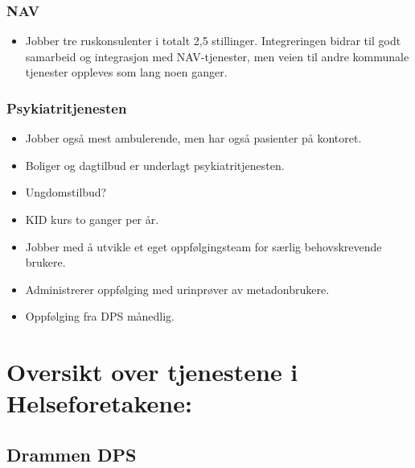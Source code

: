 \documentclass[11pt]{report} %
\begin{document}
                    \subsubsection{NAV}\label{sec:org_nek_nav}
                      \begin{itemize}
                        \item Jobber tre ruskonsulenter i totalt 2,5 stillinger. Integreringen bidrar til godt samarbeid og integrasjon med NAV-tjenester, men veien til andre kommunale tjenester oppleves som lang noen ganger. 
                      \end{itemize}
                    \subsubsection{Psykiatritjenesten}\label{sec:org_nek_psyk}  
                      \begin{itemize} 
                        \item Jobber også mest ambulerende, men har også pasienter på kontoret. 
                        \item Boliger og dagtilbud er underlagt psykiatritjenesten.
                        \item Ungdomstilbud?
                        \item KID kurs to ganger per år.
                        \item Jobber med å utvikle et eget oppfølgingsteam for særlig behovskrevende brukere. 
                        \item Administrerer oppfølging med urinprøver av metadonbrukere. 
                        \item Oppfølging fra DPS månedlig.
                      \end{itemize}
                  
                      
                  \section{Oversikt over tjenestene i Helseforetakene:}
                    \subsection{Drammen DPS}\label{sec:org_ddps}
\end{document}

